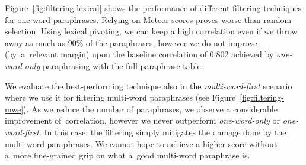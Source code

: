 \documentclass[11pt]{article}
\def\Fref#1{Figure~\ref{#1}}
\begin{document}
\Fref{fig:filtering-lexical} shows the performance of different filtering
techniques for one-word paraphrases. Relying on Meteor scores proves worse than
random selection. Using lexical pivoting, we can keep a high correlation even if we
throw away as much as 90\% of the paraphrases, however we do not improve 
(by~a~relevant margin) upon the baseline correlation of 0.802 achieved by
\emph{one-word-only} paraphrasing with the full paraphrase table.

We evaluate the best-performing technique also in the \textit{multi-word-first}
scenario where we use it for filtering multi-word paraphrases (see
\Fref{fig:filtering-mwe}). As we reduce the number of paraphrases, we observe a
considerable improvement of~correlation, however we never outperform
\textit{one-word-only} or \textit{one-word-first}. In this case, the filtering
simply mitigates the damage done by the multi-word paraphrases. We
cannot hope to achieve a higher score without a~more fine-grained grip on what
a~good multi-word paraphrase is.
\end{document}
